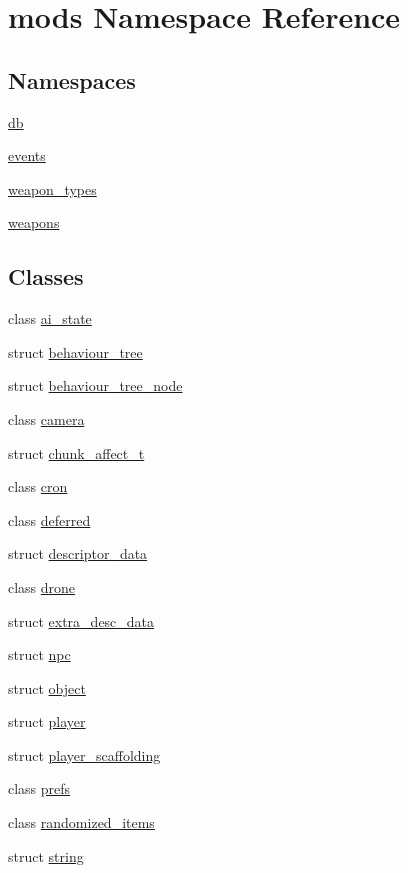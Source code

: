 \hypertarget{namespacemods}{}\section{mods Namespace Reference}
\label{namespacemods}
\subsection*{Namespaces}
\begin{DoxyCompactItemize}
\item 
 \hyperlink{namespacemods_1_1db}{db}
\item 
 \hyperlink{namespacemods_1_1events}{events}
\item 
 \hyperlink{namespacemods_1_1weapon__types}{weapon\+\_\+types}
\item 
 \hyperlink{namespacemods_1_1weapons}{weapons}
\end{DoxyCompactItemize}
\subsection*{Classes}
\begin{DoxyCompactItemize}
\item 
class \hyperlink{classmods_1_1ai__state}{ai\+\_\+state}
\item 
struct \hyperlink{structmods_1_1behaviour__tree}{behaviour\+\_\+tree}
\item 
struct \hyperlink{structmods_1_1behaviour__tree__node}{behaviour\+\_\+tree\+\_\+node}
\item 
class \hyperlink{classmods_1_1camera}{camera}
\item 
struct \hyperlink{structmods_1_1chunk__affect__t}{chunk\+\_\+affect\+\_\+t}
\item 
class \hyperlink{classmods_1_1cron}{cron}
\item 
class \hyperlink{classmods_1_1deferred}{deferred}
\item 
struct \hyperlink{structmods_1_1descriptor__data}{descriptor\+\_\+data}
\item 
class \hyperlink{classmods_1_1drone}{drone}
\item 
struct \hyperlink{structmods_1_1extra__desc__data}{extra\+\_\+desc\+\_\+data}
\item 
struct \hyperlink{structmods_1_1npc}{npc}
\item 
struct \hyperlink{structmods_1_1object}{object}
\item 
struct \hyperlink{classmods_1_1player}{player}
\item 
struct \hyperlink{structmods_1_1player__scaffolding}{player\+\_\+scaffolding}
\item 
class \hyperlink{classmods_1_1prefs}{prefs}
\item 
class \hyperlink{classmods_1_1randomized__items}{randomized\+\_\+items}
\item 
struct \hyperlink{structmods_1_1string}{string}
\end{DoxyCompactItemize}
